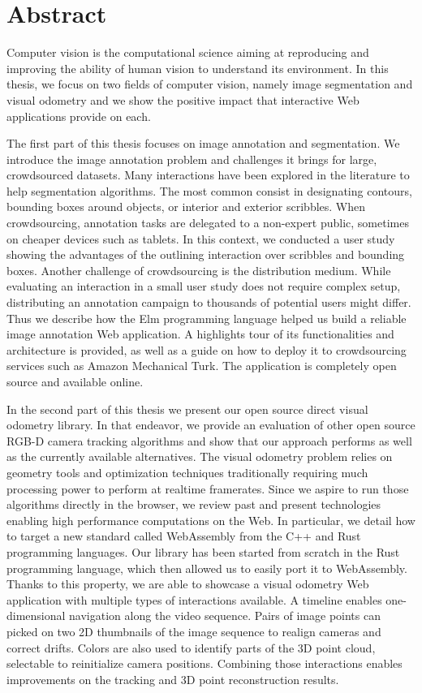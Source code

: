 \section*{Abstract}%
\label{sec:Abstract}

Computer vision is the computational science aiming at reproducing and improving
the ability of human vision to understand its environment.
In this thesis, we focus on two fields of computer vision, namely image segmentation
and visual odometry and
we show the positive impact that interactive Web applications provide on each.

The first part of this thesis focuses on image annotation and segmentation.
We introduce the image annotation problem
and challenges it brings for large, crowdsourced datasets.
Many interactions have been explored in the literature to help segmentation algorithms.
The most common consist in designating contours,
bounding boxes around objects,
or interior and exterior scribbles.
When crowdsourcing, annotation tasks are delegated
to a non-expert public, sometimes on cheaper devices such as tablets.
In this context, we conducted a user study showing
the advantages of the outlining interaction over scribbles and bounding boxes.
Another challenge of crowdsourcing is the distribution medium.
While evaluating an interaction in a small user study does not require complex setup,
distributing an annotation campaign to thousands of potential users might differ.
Thus we describe how the Elm programming language helped us
build a reliable image annotation Web application.
A highlights tour of its functionalities and architecture is provided,
as well as a guide on how to deploy it to crowdsourcing services
such as Amazon Mechanical Turk.
The application is completely open source and available online.

In the second part of this thesis we present our open source
direct visual odometry library.
In that endeavor, we provide an evaluation of other open source
RGB-D camera tracking algorithms and show that our approach
performs as well as the currently available alternatives.
The visual odometry problem relies on geometry tools and optimization techniques
traditionally requiring much processing power to perform at realtime framerates.
Since we aspire to run those algorithms directly in the browser,
we review past and present technologies
enabling high performance computations on the Web.
In particular, we detail how to target a new standard called WebAssembly from
the C++ and Rust programming languages.
Our library has been started from scratch in the Rust programming language,
which then allowed us to easily port it to WebAssembly.
Thanks to this property, we are able to showcase
a visual odometry Web application with multiple types of interactions available.
A timeline enables one-dimensional navigation along the video sequence.
Pairs of image points can picked on two 2D thumbnails
of the image sequence to realign cameras and correct drifts.
Colors are also used to identify parts of the 3D point cloud,
selectable to reinitialize camera positions.
Combining those interactions enables improvements
on the tracking and 3D point reconstruction results.
